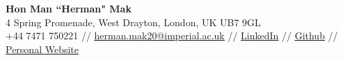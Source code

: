 \documentclass[a4paper,11pt]{article}
\begin{document}

\begin{center}
    \textbf{\Large Hon Man ``Herman" Mak} \\ \vspace{1pt}
    4 Spring Promenade, West Drayton, London, UK UB7 9GL\\
    \small +44 7471 750221 // \href{mailto:herman.mak20@imperial.ac.uk}{\underline{herman.mak20@imperial.ac.uk}} // %
    \href{https://www.linkedin.com/in/herman-hm-mak/}{\underline{LinkedIn}} // %
    \href{https://github.com/hermanmakhm}{\underline{Github}} // %
    \href{https://hermanmak.com}{\underline{Personal Website}}%
\end{center}


\end{document}

